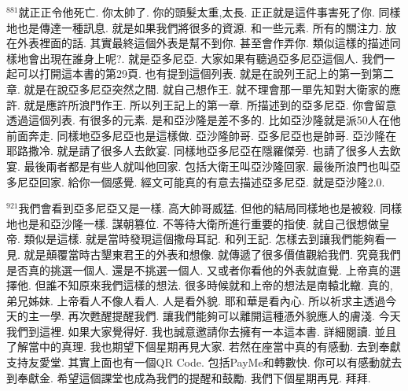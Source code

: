 \documentclass{book}
\begin{document}
$^{881}$就正正令他死亡.
你太帥了.
你的頭髮太重,太長.
正正就是這件事害死了你.
同樣地也是傳達一種訊息.
就是如果我們將很多的資源.
和一些元素.
所有的關注力.
放在外表裡面的話.
其實最終這個外表是幫不到你.
甚至會作弄你.
類似這樣的描述同樣地會出現在誰身上呢?.
就是亞多尼亞.
大家如果有聽過亞多尼亞這個人.
我們一起可以打開這本書的第29頁.
也有提到這個列表.
就是在說列王記上的第一到第二章.
就是在說亞多尼亞突然之間.
就自己想作王.
就不理會那一單先知對大衛家的應許.
就是應許所浪門作王.
所以列王記上的第一章.
所描述到的亞多尼亞.
你會留意透過這個列表.
有很多的元素.
是和亞沙隆是差不多的.
比如亞沙隆就是派50人在他前面奔走.
同樣地亞多尼亞也是這樣做.
亞沙隆帥哥.
亞多尼亞也是帥哥.
亞沙隆在耶路撒冷.
就是請了很多人去飲宴.
同樣地亞多尼亞在隱羅傑旁.
也請了很多人去飲宴.
最後兩者都是有些人就叫他回家.
包括大衛王叫亞沙隆回家.
最後所浪門也叫亞多尼亞回家.
給你一個感覺.
經文可能真的有意去描述亞多尼亞.
就是亞沙隆2.0.

$^{921}$我們會看到亞多尼亞又是一樣.
高大帥哥威猛.
但他的結局同樣地也是被殺.
同樣地也是和亞沙隆一樣.
謀朝篡位.
不等待大衛所進行重要的指使.
就自己很想做皇帝.
類似是這樣.
就是當時發現這個撒母耳記.
和列王記.
怎樣去到讓我們能夠看一見.
就是顛覆當時古墾東君王的外表和想像.
就傳遞了很多價值觀給我們.
究竟我們是否真的挑選一個人.
還是不挑選一個人.
又或者你看他的外表就直覺.
上帝真的選擇他.
但誰不知原來我們這樣的想法.
很多時候就和上帝的想法是南轅北轍.
真的,弟兄姊妹.
上帝看人不像人看人.
人是看外貌.
耶和華是看內心.
所以祈求主透過今天的主一學.
再次甦醒提醒我們.
讓我們能夠可以離開這種憑外貌應人的膚淺.
今天我們到這裡.
如果大家覺得好.
我也誠意邀請你去擁有一本這本書.
詳細閱讀.
並且了解當中的真理.
我也期望下個星期再見大家.
若然在座當中真的有感動.
去到奉獻支持友愛堂.
其實上面也有一個QR Code.
包括PayMe和轉數快.
你可以有感動就去到奉獻金.
希望這個課堂也成為我們的提醒和鼓勵.
我們下個星期再見.
拜拜.

\newpage
\end{document}
